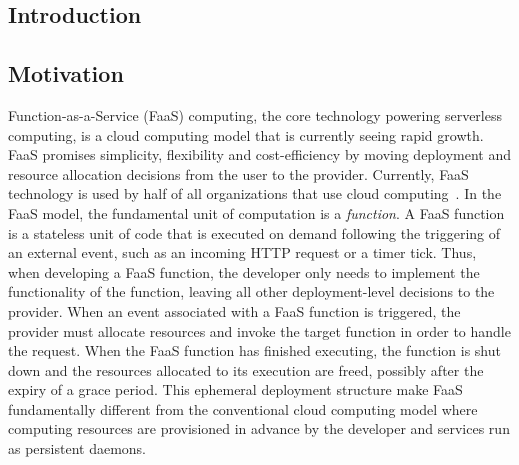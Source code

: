 \documentclass[../main.tex]{subfiles}
\begin{document}
\ifx\chapincluded\undefined
  \begin{refsection}
 \fi


\chapter{Introduction}
\label{chap:intro}

\section{Motivation}

Function-as-a-Service (FaaS) computing, the core technology powering
serverless computing, is a cloud computing model that is currently
seeing rapid growth. FaaS promises simplicity, flexibility and
cost-efficiency by moving deployment and resource allocation decisions
from the user to the provider. Currently, FaaS technology is used by
half of all organizations that use cloud
computing~\cite{serverless_state}. In the FaaS model, the fundamental
unit of computation is a \emph{function}. A FaaS function is a
stateless unit of code that is executed on demand following the
triggering of an external event, such as an incoming HTTP request or a
timer tick. Thus, when developing a FaaS function, the developer only
needs to implement the functionality of the function, leaving all
other deployment-level decisions to the provider.
When an event associated with a FaaS function is triggered,
the provider must allocate resources and invoke the target function in
order to handle the request. When the FaaS function has finished
executing, the function is shut down and the resources allocated to
its execution are freed, possibly after the expiry of a grace
period. This ephemeral deployment structure make FaaS fundamentally
different from the conventional cloud computing model where computing
resources are provisioned in advance by the developer and services run
as persistent daemons.


\end{refsection}
\end{document}
